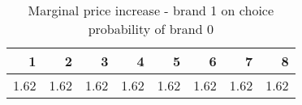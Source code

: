 \begin{table}[ht]
\centering
\begin{tabular}{rrrrrrrr}
  \hline
1 & 2 & 3 & 4 & 5 & 6 & 7 & 8 \\ 
  \hline
1.62 & 1.62 & 1.62 & 1.62 & 1.62 & 1.62 & 1.62 & 1.62 \\ 
   \hline
\end{tabular}
\caption{Marginal price increase - brand 1 on choice probability of brand 0} 
\label{tab:mg2c}
\end{table}
